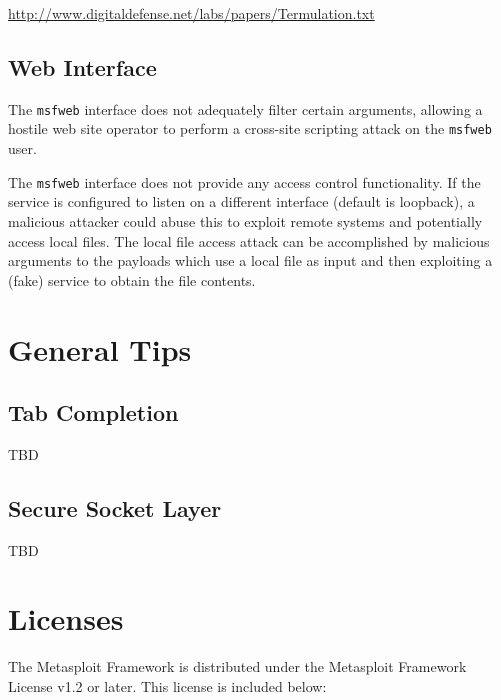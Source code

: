 \documentclass{report}
\begin{document}
\url{http://www.digitaldefense.net/labs/papers/Termulation.txt}


	\section{Web Interface}
\par
The \texttt{msfweb} interface does not adequately filter certain arguments,
allowing a hostile web site operator to perform a cross-site scripting
attack on the \texttt{msfweb} user.

\par
The \texttt{msfweb} interface does not provide any access control functionality. If
the service is configured to listen on a different interface (default is
loopback), a malicious attacker could abuse this to exploit remote systems
and potentially access local files. The local file access attack can be
accomplished by malicious arguments to the payloads which use a local file
as input and then exploiting a (fake) service to obtain the file contents.
	

\pagebreak
\chapter{General Tips}

	\section{Tab Completion}
	\label{REF-TAB}
\par
TBD
	\section{Secure Socket Layer}
	\label{REF-SSL}
\par
TBD

\pagebreak
\chapter{Licenses}

\par
The Metasploit Framework is distributed under the Metasploit Framework License
v1.2 or later.  This license is included below:
\end{document}
